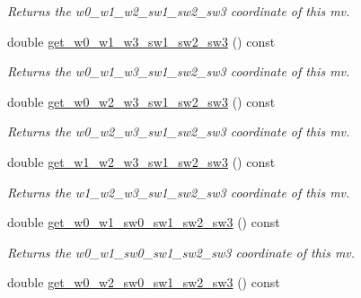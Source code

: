 \begin{DoxyCompactItemize}
\begin{DoxyCompactList}\small\item\em Returns the w0\-\_\-w1\-\_\-w2\-\_\-sw1\-\_\-sw2\-\_\-sw3 coordinate of this mv. \end{DoxyCompactList}\item 
\hypertarget{classe3ga_1_1mv_a697ec55a3b585879acaa4ffea33f9b97}{double \hyperlink{classe3ga_1_1mv_a697ec55a3b585879acaa4ffea33f9b97}{get\-\_\-w0\-\_\-w1\-\_\-w3\-\_\-sw1\-\_\-sw2\-\_\-sw3} () const }\label{classe3ga_1_1mv_a697ec55a3b585879acaa4ffea33f9b97}

\begin{DoxyCompactList}\small\item\em Returns the w0\-\_\-w1\-\_\-w3\-\_\-sw1\-\_\-sw2\-\_\-sw3 coordinate of this mv. \end{DoxyCompactList}\item 
\hypertarget{classe3ga_1_1mv_ae90307e9e88cf2f073ab7dcfac3e8200}{double \hyperlink{classe3ga_1_1mv_ae90307e9e88cf2f073ab7dcfac3e8200}{get\-\_\-w0\-\_\-w2\-\_\-w3\-\_\-sw1\-\_\-sw2\-\_\-sw3} () const }\label{classe3ga_1_1mv_ae90307e9e88cf2f073ab7dcfac3e8200}

\begin{DoxyCompactList}\small\item\em Returns the w0\-\_\-w2\-\_\-w3\-\_\-sw1\-\_\-sw2\-\_\-sw3 coordinate of this mv. \end{DoxyCompactList}\item 
\hypertarget{classe3ga_1_1mv_ae9934a32aae9eacb9186065a70fad453}{double \hyperlink{classe3ga_1_1mv_ae9934a32aae9eacb9186065a70fad453}{get\-\_\-w1\-\_\-w2\-\_\-w3\-\_\-sw1\-\_\-sw2\-\_\-sw3} () const }\label{classe3ga_1_1mv_ae9934a32aae9eacb9186065a70fad453}

\begin{DoxyCompactList}\small\item\em Returns the w1\-\_\-w2\-\_\-w3\-\_\-sw1\-\_\-sw2\-\_\-sw3 coordinate of this mv. \end{DoxyCompactList}\item 
\hypertarget{classe3ga_1_1mv_a6c511170ebb73148d702b4f1e32b2090}{double \hyperlink{classe3ga_1_1mv_a6c511170ebb73148d702b4f1e32b2090}{get\-\_\-w0\-\_\-w1\-\_\-sw0\-\_\-sw1\-\_\-sw2\-\_\-sw3} () const }\label{classe3ga_1_1mv_a6c511170ebb73148d702b4f1e32b2090}

\begin{DoxyCompactList}\small\item\em Returns the w0\-\_\-w1\-\_\-sw0\-\_\-sw1\-\_\-sw2\-\_\-sw3 coordinate of this mv. \end{DoxyCompactList}\item 
\hypertarget{classe3ga_1_1mv_a0280c32ac9abafe78fdc53822e624aed}{double \hyperlink{classe3ga_1_1mv_a0280c32ac9abafe78fdc53822e624aed}{get\-\_\-w0\-\_\-w2\-\_\-sw0\-\_\-sw1\-\_\-sw2\-\_\-sw3} () const }\label{classe3ga_1_1mv_a0280c32ac9abafe78fdc53822e624aed}


\end{DoxyCompactItemize}
